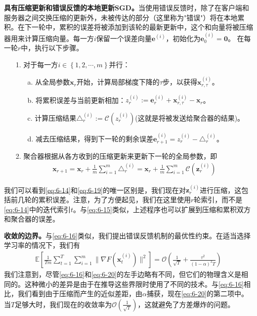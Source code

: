 \textbf{具有压缩更新和错误反馈的本地更新SGD。}当使用错误反馈时，除了在客户端和服务器之间交换压缩的更新外，未被传达的部分（这里称为"错误"）将在本地累积。在下一轮中，累积的误差将被添加到该轮的最新更新中，这个和向量将被压缩器用来计算压缩向量。每一方$i$保留一个误差向量$\bm{e}^{(i)}$，初始化为$\bm{e}^{(i)}_{0}=\bm{0}$。 在每一轮$r$中，执行以下步骤。
\begin{enumerate}
	\item[1.]  对于每一方$i \in \left\{1, 2, \cdots, m\right\}$并行：
	\begin{enumerate}
		\item[a.] 从全局参数$\bm{x}_{r}$开始，计算局部梯度下降的$\tau$步，以获得$\bm{x}_{r, \tau}^{(i)}$。
		\item[b.] 将累积误差与当前更新相加：$z_{r}^{(i)} := \bm{e}_{r}^{(i)} + \bm{x}_{r, \tau}^{(i)} - \bm{x}_{r}$。
		\item[c.] 计算压缩结果$\triangle_{r}^{(i)} := \mathcal{C}(z_{r}^{(i)})$(这就是将被发送给聚合器的结果)。
		\item[d.] 减去压缩结果，得到下一轮的剩余误差$\bm{e}_{r+1}^{(i)} = z_{r}^{(i)}- \triangle_{r}^{(i)}$。
	\end{enumerate}
	\item[2.] 聚合器根据从各方收到的压缩更新来更新下一轮的全局参数，即
	\begin{align}\label{eq:6-19}
		\bm{x}_{r+1}  = \bm{x}_{r} + \frac{1}{m}\sum_{i=1}^{m}\triangle_{r}^{(i)} = \bm{x}_{r} + \frac{1}{m}\sum_{i=1}^{m}\mathcal{C}(\bm{z}_{r}^{(i)})
	\end{align}
\end{enumerate}
我们可以看到\ref{eq:6-14}和\ref{eq:6-19}的唯一区别是，我们现在对$\bm{z}_{r}^{(i)}$进行压缩，这包括前几轮的累积误差。注意，为了方便起见，我们在这里使用$r$轮索引，而不是\ref{eq:6-14}中的迭代索引$t$。与\ref{eq:6-15}类似，上述程序也可以扩展到压缩和累积双方和聚合器的误差。
	
\textbf{收敛的边界。}与\ref{eq:6-16}类似，我们提出错误反馈机制的最优性约束。在适当选择学习率的情况下，我们有
\begin{align}\label{eq:6-20}
	\mathbb{E}[\frac{1}{Tm}\sum_{t=1}^{T}\sum_{i=1}^{m}\|\nabla F(\bm{x}_{t}^{(i)})\|^{2}] = \mathcal{O}(\frac{1}{\sqrt{T}} + \frac{\tau^{2}}{(1-\alpha)^{2}T})
\end{align}
我们注意到，尽管\ref{eq:6-16}和\ref{eq:6-20}的左手边略有不同，但它们的物理含义是相同的。这种微小的差异是由于在推导这些界限时使用了不同的技术。与\ref{eq:6-16}相比，我们看到由于压缩而产生的近似差距，由$\alpha$捕获，现在\ref{eq:6-20}的第二项中。当$T$足够大时，我们现在的收敛率为$\mathcal{O}(\frac{1}{\sqrt{T}})$，这就避免了方差爆炸的问题。

